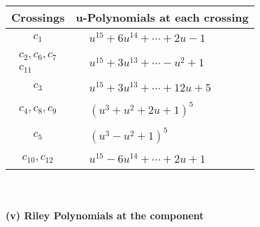 \documentclass[1p]{elsarticle_modified}
\theoremstyle{definition}
\begin{document}
\begin{tabular}{m{50pt}|m{274pt}}
Crossings & \hspace{64pt}u-Polynomials at each crossing \\
\hline $$\begin{aligned}c_{1}\end{aligned}$$&$\begin{aligned}
&u^{15}+6 u^{14}+\cdots+2 u-1
\end{aligned}$\\
\hline $$\begin{aligned}c_{2},c_{6},c_{7}\\c_{11}\end{aligned}$$&$\begin{aligned}
&u^{15}+3 u^{13}+\cdots- u^2+1
\end{aligned}$\\
\hline $$\begin{aligned}c_{3}\end{aligned}$$&$\begin{aligned}
&u^{15}+3 u^{13}+\cdots+12 u+5
\end{aligned}$\\
\hline $$\begin{aligned}c_{4},c_{8},c_{9}\end{aligned}$$&$\begin{aligned}
&(u^3+u^2+2 u+1)^5
\end{aligned}$\\
\hline $$\begin{aligned}c_{5}\end{aligned}$$&$\begin{aligned}
&(u^3- u^2+1)^5
\end{aligned}$\\
\hline $$\begin{aligned}c_{10},c_{12}\end{aligned}$$&$\begin{aligned}
&u^{15}-6 u^{14}+\cdots+2 u+1
\end{aligned}$\\
\hline
\end{tabular}\\~\\
\newpage\renewcommand{\arraystretch}{1}
\flushleft \textbf{(v) Riley Polynomials at the component}\newline \\
\end{document}
